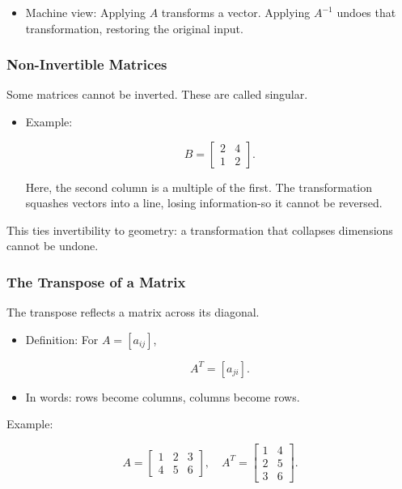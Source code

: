 \documentclass[
  letterpaper,
  DIV=11,
  numbers=noendperiod]{scrreprt}
\providecommand{\tightlist}{%
  \setlength{\itemsep}{0pt}\setlength{\parskip}{0pt}}
\begin{document}
\begin{itemize}
\tightlist
\item
  Machine view: Applying \(A\) transforms a vector. Applying \(A^{-1}\)
  undoes that transformation, restoring the original input.
\end{itemize}

\subsubsection{Non-Invertible Matrices}\label{non-invertible-matrices}

Some matrices cannot be inverted. These are called singular.

\begin{itemize}
\item
  Example:

  \[
  B = \begin{bmatrix} 
  2 & 4 \\ 
  1 & 2 
  \end{bmatrix}.
  \]

  Here, the second column is a multiple of the first. The transformation
  squashes vectors into a line, losing information-so it cannot be
  reversed.
\end{itemize}

This ties invertibility to geometry: a transformation that collapses
dimensions cannot be undone.

\subsubsection{The Transpose of a
Matrix}\label{the-transpose-of-a-matrix}

The transpose reflects a matrix across its diagonal.

\begin{itemize}
\item
  Definition: For \(A = [a_{ij}]\),

  \[
  A^T = [a_{ji}].
  \]
\item
  In words: rows become columns, columns become rows.
\end{itemize}

Example:

\[
A = \begin{bmatrix} 
1 & 2 & 3 \\ 
4 & 5 & 6 
\end{bmatrix}, 
\quad 
A^T = \begin{bmatrix} 
1 & 4 \\ 
2 & 5 \\ 
3 & 6 
\end{bmatrix}.
\]
\end{document}
